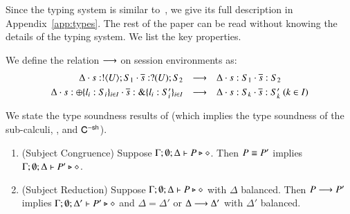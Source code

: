 \smallskip

Since the typing system is similar to~\cite{tlca07,mostrous_phd}, we give 
its full description in Appendix~\ref{app:types}.  The rest of the paper can
be read without knowing the details of the typing system. We list the
key properties.

\smallskip

\begin{definition}%
\label{def:ses_red}
We define the relation $\longrightarrow$ on session environments as:
\[
\begin{array}{rcl}
\Delta \cdot s: ! \langle U \rangle ; S_1 \cdot \overline{s}: ? (U) ; S_2 & \longrightarrow & 
\Delta \cdot s: S_1 \cdot \overline{s}: S_2\\[1mm]
\Delta \cdot s: \oplus \{l_i: S_i\}_{i \in I} \cdot \overline{s}: \& \{l_i: S_i'\}_{i \in I} & \longrightarrow & \Delta \cdot s: S_k \cdot \overline{s}: S_k' \ (k \in I)
\end{array}
\]
\end{definition}

\smallskip

\noi We state the type soundness results of \HOp (which implies 
the type soundness of the sub-calculi, \HO, \sessp and $\mathsf{C}^{-\mathsf{sh}}$). 

\smallskip

\begin{theorem}\label{t:sr}%
	\begin{enumerate}[1.]
	\item	(Subject Congruence) Suppose $\Gamma; \emptyset; \Delta \vdash P \triangleright \diamond$.
		Then $P \equiv P'$ implies $\Gamma; \emptyset; \Delta \vdash P' \triangleright \diamond$.

	\item	(Subject Reduction) Suppose $\Gamma; \emptyset; \Delta \vdash P \triangleright \diamond$
			with
			$\Delta$ balanced. 
			Then $P \longrightarrow P'$ implies $\Gamma; \emptyset; \Delta'  \vdash P' \triangleright \diamond$
			and $\Delta = \Delta'$ or $\Delta \longrightarrow \Delta'$
with $\Delta'$ balanced. 
	\end{enumerate}
\end{theorem}
